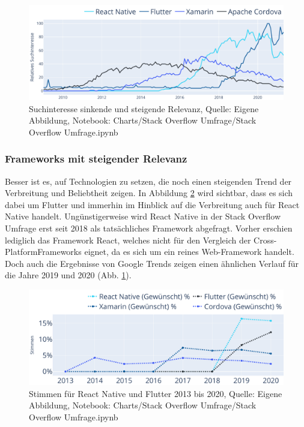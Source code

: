 \begin{figure}[H]
	\centering
    \includegraphics[width=1.0\textwidth]{Charts/Google Trends/Suchinteresse sinkende und steigende Relevanz.pdf}
	\caption[Suchinteresse sinkende und steigende Relevanz]{Suchinteresse sinkende und steigende Relevanz, Quelle: Eigene Abbildung, Notebook: Charts/Stack Overflow Umfrage/Stack Overflow Umfrage.ipynb}
	\label{fig:SuchinteresseSinkendeUndSteigendeRelevanz}
\end{figure}

\subsubsection{Frameworks mit steigender Relevanz}

Besser ist es, auf Technologien zu setzen, die noch einen steigenden Trend der Verbreitung und Beliebtheit zeigen. In Abbildung \ref{fig:ReactNativeUndFlutterStimmen} wird sichtbar, dass es sich dabei um Flutter und immerhin im Hinblick auf die Verbreitung auch für React Native handelt. Ungünstigerweise wird React Native in der Stack Overflow Umfrage erst seit 2018 als tatsächliches Framework abgefragt. Vorher erschien lediglich das Framework React, welches nicht für den Vergleich der Cross-PlatformFrameworks eignet, da es sich um ein reines Web-Framework handelt. Doch auch die Ergebnisse von Google Trends zeigen einen ähnlichen Verlauf für die Jahre 2019 und 2020 (Abb. \ref{fig:SuchinteresseSinkendeUndSteigendeRelevanz}).

\begin{figure}[H]
	\centering
    \includegraphics[width=1.0\textwidth]{Charts/Stack Overflow Umfrage/React Native und Flutter Stimmen.pdf}
	\caption[Stimmen für React Native und Flutter]{Stimmen für React Native und Flutter 2013 bis 2020, Quelle: Eigene Abbildung, Notebook: Charts/Stack Overflow Umfrage/Stack Overflow Umfrage.ipynb}
	\label{fig:ReactNativeUndFlutterStimmen}
\end{figure}


